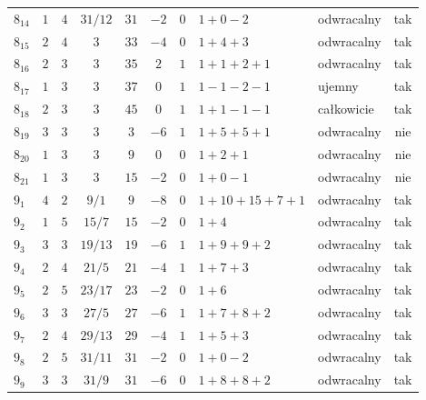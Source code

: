 \begin{longtable}{lccccccllc}
$8_{14}$    &  $1$     &  $4$  &  $31/12$  &  $31$   &  $-2$  &  $0$  &  $1+0-2$        &  odwracalny  &  tak  \\
$8_{15}$    &  $2$     &  $4$  &  $3$      &  $33$   &  $-4$  &  $0$  &  $1+4+3$        &  odwracalny  &  tak  \\
$8_{16}$    &  $2$     &  $3$  &  $3$      &  $35$   &  $2$   &  $1$  &  $1+1+2+1$      &  odwracalny  &  tak  \\
$8_{17}$    &  $1$     &  $3$  &  $3$      &  $37$   &  $0$   &  $1$  &  $1-1-2-1$      &  ujemny      &  tak  \\
$8_{18}$    &  $2$     &  $3$  &  $3$      &  $45$   &  $0$   &  $1$  &  $1+1-1-1$      &  całkowicie  &  tak  \\
$8_{19}$    &  $3$     &  $3$  &  $3$      &  $3$    &  $-6$  &  $1$  &  $1+5+5+1$      &  odwracalny  &  nie  \\
$8_{20}$    &  $1$     &  $3$  &  $3$      &  $9$    &  $0$   &  $0$  &  $1+2+1$        &  odwracalny  &  nie  \\
$8_{21}$    &  $1$     &  $3$  &  $3$      &  $15$   &  $-2$  &  $0$  &  $1+0-1$        &  odwracalny  &  nie  \\
$9_{1}$     &  $4$     &  $2$  &  $9/1$    &  $9$    &  $-8$  &  $0$  &  $1+10+15+7+1$  &  odwracalny  &  tak  \\
$9_{2}$     &  $1$     &  $5$  &  $15/7$   &  $15$   &  $-2$  &  $0$  &  $1+4$          &  odwracalny  &  tak  \\
$9_{3}$     &  $3$     &  $3$  &  $19/13$  &  $19$   &  $-6$  &  $1$  &  $1+9+9+2$      &  odwracalny  &  tak  \\
$9_{4}$     &  $2$     &  $4$  &  $21/5$   &  $21$   &  $-4$  &  $1$  &  $1+7+3$        &  odwracalny  &  tak  \\
$9_{5}$     &  $2$     &  $5$  &  $23/17$  &  $23$   &  $-2$  &  $0$  &  $1+6$          &  odwracalny  &  tak  \\
$9_{6}$     &  $3$     &  $3$  &  $27/5$   &  $27$   &  $-6$  &  $1$  &  $1+7+8+2$      &  odwracalny  &  tak  \\
$9_{7}$     &  $2$     &  $4$  &  $29/13$  &  $29$   &  $-4$  &  $1$  &  $1+5+3$        &  odwracalny  &  tak  \\
$9_{8}$     &  $2$     &  $5$  &  $31/11$  &  $31$   &  $-2$  &  $0$  &  $1+0-2$        &  odwracalny  &  tak  \\
$9_{9}$     &  $3$     &  $3$  &  $31/9$   &  $31$   &  $-6$  &  $0$  &  $1+8+8+2$      &  odwracalny  &  tak  \\

\end{longtable}
